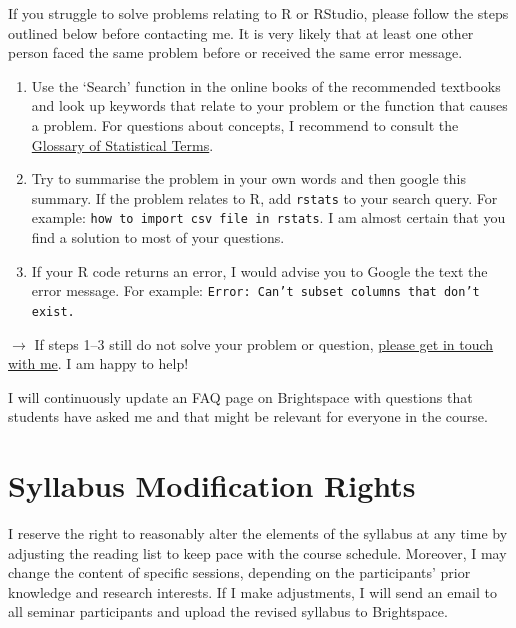 \documentclass[abstract=on,parskip=full,headings=standardclasses,fontsize=11pt,paper=a4]{scrartcl}
\begin{document}
If you struggle to solve problems relating to \textsf{R} or RStudio, please follow the steps outlined below before contacting me. It is very likely that at least one other person faced the same problem before or received the same error message. %
\begin{enumerate}
\item Use the `Search' function in the online books of the recommended textbooks \autocite{ismay20,wickham17,healy19} and look up keywords that relate to your problem or the function that causes a problem. For questions about concepts, I recommend to consult the \href{https://hbiostat.org/doc/glossary.pdf}{Glossary of Statistical Terms}.
\item Try to summarise the problem in your own words and then google this summary. If the problem relates to \textsf{R}, add \texttt{rstats} to your search query. For example: \texttt{how to import csv file in rstats}. I am almost certain that you find a solution to most of your questions. 
\item If your \textsf{R} code returns an error, I would advise you to Google the text the error message.  For example: \texttt{Error: Can't subset columns that don't exist.}
\end{enumerate}

$\longrightarrow$ If steps 1--3 still do not solve your problem or question, \href{mailto:stefan.mueller@ucd.ie}{please get in touch with me}.  I am happy to help!

I will continuously update an FAQ page on Brightspace with questions that students have asked me and that might be relevant for everyone in the course. 



\section*{Syllabus Modification Rights}

I reserve the right to reasonably alter the elements of the syllabus at any time by adjusting the reading list to keep pace with the course schedule. Moreover, I may change the content of specific sessions, depending on the participants' prior knowledge and research interests. If I make adjustments, I will send an email to all seminar participants and upload the revised syllabus to Brightspace.


\tableofcontents
\end{document}

